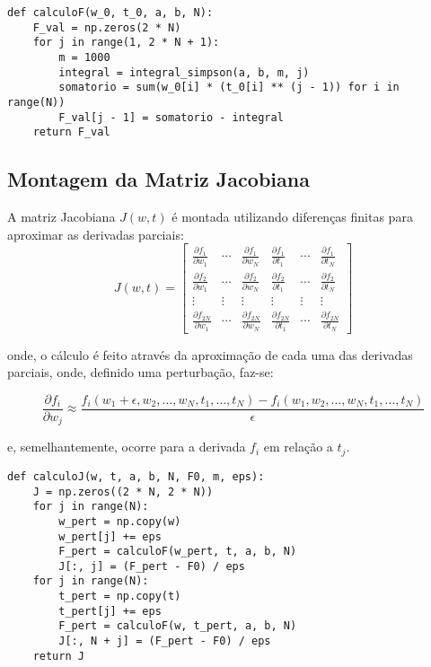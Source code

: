 \documentclass[12pt,letterpaper]{article}
\begin{document}
\begin{lstlisting}[style=Python]
def calculoF(w_0, t_0, a, b, N):
    F_val = np.zeros(2 * N)
    for j in range(1, 2 * N + 1):
        m = 1000
        integral = integral_simpson(a, b, m, j)
        somatorio = sum(w_0[i] * (t_0[i] ** (j - 1)) for i in range(N))
        F_val[j - 1] = somatorio - integral
    return F_val
\end{lstlisting}

\subsection{Montagem da Matriz Jacobiana}
A matriz Jacobiana \(J(w, t)\) é montada utilizando diferenças finitas para aproximar as derivadas parciais:
\[
J(w, t) =
\begin{bmatrix}
\frac{\partial f_1}{\partial w_1} & \cdots & \frac{\partial f_1}{\partial w_N} & \frac{\partial f_1}{\partial t_1} & \cdots & \frac{\partial f_1}{\partial t_N} \\
\frac{\partial f_2}{\partial w_1} & \cdots & \frac{\partial f_2}{\partial w_N} & \frac{\partial f_2}{\partial t_1} & \cdots & \frac{\partial f_2}{\partial t_N} \\
\vdots & \vdots & \vdots & \vdots & \vdots & \vdots \\
\frac{\partial f_{2N}}{\partial w_1} & \cdots & \frac{\partial f_{2N}}{\partial w_N} & \frac{\partial f_{2N}}{\partial t_1} & \cdots & \frac{\partial f_{2N}}{\partial t_N}
\end{bmatrix}
\]

onde, o cálculo é feito através da aproximação de cada uma das derivadas parciais, onde, definido uma perturbação, faz-se:

$$
\frac{\partial f_i}{\partial w_j} \approx \frac{f_i(w_1 + \epsilon, w_2, \dots, w_N, t_1, \dots, t_N) - f_i(w_1, w_2, \dots, w_N, t_1, \dots, t_N)}{\epsilon}
$$

e, semelhantemente, ocorre para a derivada $f_i$ em relação a $t_j$.

\begin{lstlisting}[style=Python]
def calculoJ(w, t, a, b, N, F0, m, eps):
    J = np.zeros((2 * N, 2 * N))
    for j in range(N):
        w_pert = np.copy(w)
        w_pert[j] += eps
        F_pert = calculoF(w_pert, t, a, b, N)
        J[:, j] = (F_pert - F0) / eps
    for j in range(N):
        t_pert = np.copy(t)
        t_pert[j] += eps
        F_pert = calculoF(w, t_pert, a, b, N)
        J[:, N + j] = (F_pert - F0) / eps
    return J
\end{lstlisting}
\end{document}
